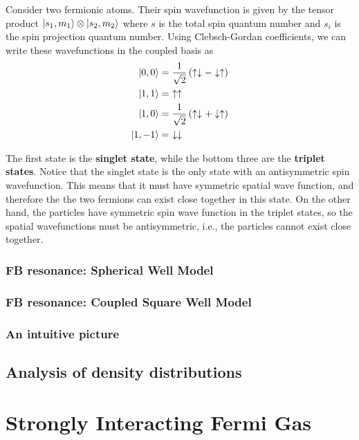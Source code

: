 \documentclass{book}
\theoremstyle{definition}
\newcommand{\f}[2]{\frac{#1}{#2}}
\newcommand{\lp}{\left(}
\newcommand{\rp}{\right)}
\begin{document}
Consider two fermionic atoms. Their spin wavefunction is given by the tensor product $\ket{s_1,m_1}\otimes \ket{s_2,m_2}$ where $s$ is the total spin quantum number and $s_i$ is the spin projection quantum number. Using Clebsch-Gordan  coefficients, we can write these wavefunctions in the coupled basis as
\begin{align*}
\ket{0,0} &= \f{1}{\sqrt{2}}\lp  \uparrow\downarrow - \downarrow\uparrow \rp \\
\ket{1,1} &= \,\,\uparrow\uparrow \\
\ket{1,0} &= \f{1}{\sqrt{2}}\lp \uparrow \downarrow + \downarrow\uparrow \rp \\
\ket{1,-1} &= \,\,\downarrow\downarrow
\end{align*}

The first state is the \textbf{singlet state}, while the bottom three are the \textbf{triplet states}. Notice that the singlet state is the only state with an antisymmetric spin wavefunction. This means that it must have symmetric spatial wave function, and therefore the the two fermions can exist close together in this state. On the other hand, the particles have symmetric spin wave function in the triplet states, so the spatial wavefunctions must be antisymmetric, i.e., the particles cannot exist close together.\\





\subsection{FB resonance: Spherical Well Model}

\subsection{FB resonance: Coupled Square Well Model}

\subsection{An intuitive picture}




\section{Analysis of density distributions}













\chapter{Strongly Interacting Fermi Gas}


 




	
	
\end{document}
